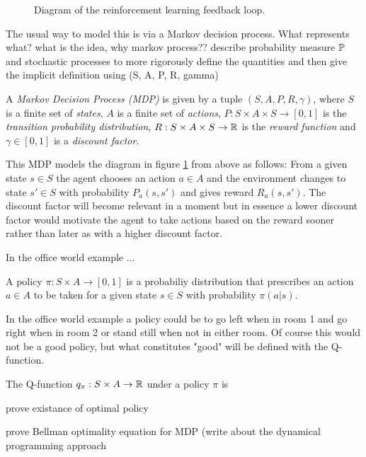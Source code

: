 \usetikzlibrary{graphs, quotes}
\begin{figure}[h]
    \centering
    \caption{Diagram of the reinforcement learning feedback loop.}
    \label{fig:rl_framework}
\end{figure}

The usual way to model this is via a Markov decision process. What represents what? what is the idea, why markov process??
describe probability measure $\P$ and stochastic processes to more rigorously define the quantities and then give the implicit definition using (S, A, P, R, gamma)

\begin{definition}
    \label{def:mdp}
    A \emph{Markov Decision Process (MDP)} is given by a tuple $(S, A, P, R, \gamma)$, where $S$ is a finite set of \emph{states}, $A$ is a finite set of \emph{actions}, $P: S \times A \times S \to [0,1]$ is the \emph{transition probability distribution}, $R: S \times A \times S \to \R$ is the \emph{reward function} and $\gamma \in [0,1]$ is a \emph{discount factor}.
\end{definition}

This MDP models the diagram in figure \ref{fig:rl_framework} from above as follows: From a given state $s \in S$ the agent chooses an action $a \in A$ and the environment changes to state $s' \in S$ with probability $P_a(s, s')$ and gives reward $R_a(s, s')$. The discount factor will become relevant in a moment but in essence a lower discount factor would motivate the agent to take actions based on the reward sooner rather than later as with a higher discount factor.

In the office world example ...

\begin{definition}
    \label{def:policy}
    A policy $\pi: S \times A \to [0,1]$ is a probabiliy distribution that prescribes an action $a \in A$ to be taken for a given state $s \in S$ with probability $\pi(a | s)$.
\end{definition}

In the office world example a policy could be to go left when in room 1 and go right when in room 2 or stand still when not in either room. Of course this would not be a good policy, but what constitutes "good" will be defined with the Q-function.

\begin{definition}
    \label{def:q}
    The Q-function $q_\pi: S \times A \to \R$ under a policy $\pi$ is

\end{definition}

prove existance of optimal policy

prove Bellman optimality equation for MDP (write about the dynamical programming approach %